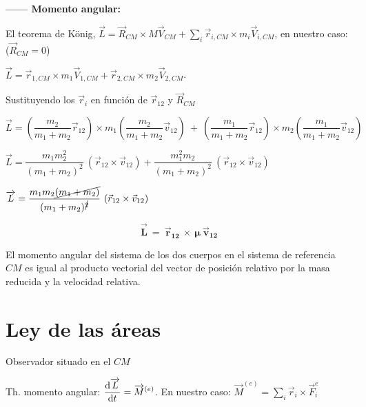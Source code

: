 \textbf{------ Momento angular:}

El teorema de König, $\overrightarrow L=\overrightarrow R_{CM}\times M \vec V_{CM}+\sum_i \vec r_{i,CM} \times m_i \vec V_{i,CM}$, en nuestro caso: \textcolor{gris}{($\vec R_{CM}=0$)}

$\overrightarrow L =  \vec r_{1,CM} \times m_1 \vec V_{1,CM} +  \vec r_{2,CM} \times m_2 \vec V_{2,CM}$. 

Sustituyendo los $\vec r_i$ en función de $\vec r_{12}$ y $\vec R_{CM}$

$\overrightarrow L = \left( \dfrac{m_2}{m_1+m_2}\vec r_{12}\right) \times m_1 \left( \dfrac {m_2}{m_1+m_2} \vec v_{12}\right) \ + \ 
\left( \dfrac{m_1}{m_1+m_2}\vec r_{12}\right) \times m_2 \left( \dfrac {m_1}{m_1+m_2} \vec v_{12}\right)$


\small{$\overrightarrow L =  \dfrac{m_1m_2^2}{(m_1+m_2)^2} \ ( \vec r_{12} \times \vec v_{12} )  +   \dfrac{m_1^2m_2}{(m_1+m_2)^2} \ ( \vec r_{12} \times \vec v_{12} ) $}

\normalsize{$\overrightarrow L = \dfrac{m_1m_2\cancel{(m_1+m_2)}}{(m_1+m_2)^{\cancel{2}}} \ ( \vec r_{12} \times \vec v_{12} ) $}

\begin{equation}
\boldsymbol{
\overrightarrow L \ = \ \vec r_{12} \ \times \  \mu \ \vec v_{12}
}	
\end{equation}

El momento angular del sistema de los dos cuerpos en el sistema de referencia $CM$ es igual al producto vectorial del vector de posición relativo por la masa reducida y la velocidad relativa.

\section{Ley de las áreas}


Observador situado en el $CM$

Th. momento angular: $\displaystyle \dv{\overrightarrow L}{t}=\overrightarrow M^{(e)}$.
En nuestro caso: $\overrightarrow M^{(e)}=\sum_i \vec r_i \times \vec F_i^{e}$

